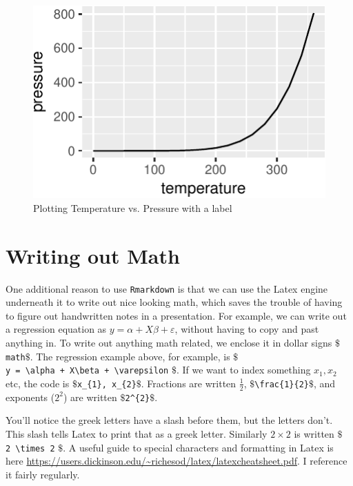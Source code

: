 \documentclass[]{article}
\begin{document}
\begin{figure}

{\centering \includegraphics{example_rmarkdown_files/figure-latex/pressure_cap_size_ling-1} 

}

\caption{\label{fig:tp}Plotting Temperature vs. Pressure with a label}\label{fig:pressure_cap_size_ling}
\end{figure}

\newpage

\section{Writing out Math}\label{writing-out-math}

One additional reason to use \texttt{Rmarkdown} is that we can use the
Latex engine underneath it to write out nice looking math, which saves
the trouble of having to figure out handwritten notes in a presentation.
For example, we can write out a regression equation as
\(y = \alpha + X\beta + \varepsilon\), without having to copy and past
anything in. To write out anything math related, we enclose it in dollar
signs \(\$\)\texttt{math}\(\$\). The regression example above, for
example, is \(\$\)
\texttt{y\ =\ \textbackslash{}alpha\ +\ X\textbackslash{}beta\ +\ \textbackslash{}varepsilon}
\(\$\). If we want to index something \(x_{1}, x_{2}\) etc, the code is
\(\$\)\texttt{x\_\{1\},\ x\_\{2\}}\(\$\). Fractions are written
\(\frac{1}{2}\), \(\$\)\texttt{\textbackslash{}frac\{1\}\{2\}}\(\$\),
and exponents (\(2^{2}\)) are written \(\$\)\texttt{2\^{}\{2\}}\(\$\).

You'll notice the greek letters have a slash before them, but the
letters don't. This slash tells Latex to print that as a greek letter.
Similarly \(2 \times 2\) is written \(\$\)
\texttt{2\ \textbackslash{}times\ 2} \(\$\). A useful guide to special
characters and formatting in Latex is here
\url{https://users.dickinson.edu/~richesod/latex/latexcheatsheet.pdf}. I
reference it fairly regularly.
\end{document}
